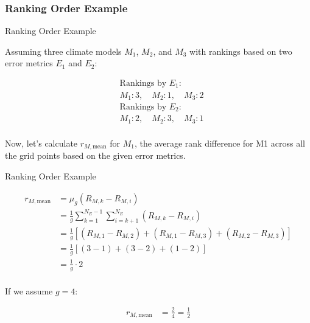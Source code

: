 \documentclass[xcolor={dvipsnames}]{beamer}
\begin{document}
\subsubsection{Ranking Order Example}

\begin{frame}{Ranking Order Example}    

Assuming three climate models $M_1$, $M_2$, and $M_3$ with rankings based on two error metrics $E_1$ and $E_2$:

\begin{align*}
&\text{Rankings by } E_1: \\
&M_1: 3, \quad M_2: 1, \quad M_3: 2 \\
&\text{Rankings by } E_2: \\
&M_1: 2, \quad M_2: 3, \quad M_3: 1 \\
\end{align*}

Now, let's calculate $r_{M,\text{mean}}$ for $M_1$, the average rank difference for M1 across all the grid points based on the given error metrics.

\end{frame}

\begin{frame}{Ranking Order Example}

\begin{align*}
r_{M,\text{mean}} &= \mu_g(R_{M,k} - R_{M,i}) \\
&= \frac{1}{g} \sum_{k=1}^{N_E-1} \sum_{i=k+1}^{N_E} (R_{M,k} - R_{M,i}) \\
&= \frac{1}{g} \left[ (R_{M,1} - R_{M,2}) + (R_{M,1} - R_{M,3}) + (R_{M,2} - R_{M,3}) \right] \\
&= \frac{1}{g} \left[ (3 - 1) + (3 - 2) + (1 - 2) \right] \\
&= \frac{1}{g} \cdot 2 \\
\end{align*}

If we assume $g = 4$:

\begin{align*}
r_{M,\text{mean}} &= \frac{2}{4} = \frac{1}{2}
\end{align*}

\end{frame}
\end{document}
